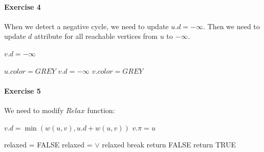\documentclass{book}
\begin{document}
	\paragraph{Exercise 4}
	When we detect a negative cycle, we need to update $u.d = -\infty$. Then we need to update $d$ attribute for all reachable vertices from $u$ to $-\infty$.
	\begin{algorithm*}[h!]
		\begin{algorithmic}[1]
				\State {}
						\State {}
					\EndFor
				\EndFor
				\State {}
						\State $v.d = -\infty$
						\State {}
					\EndIf
				\EndFor
			\EndFunction
		\end{algorithmic}
	\end{algorithm*}
	\begin{algorithm*}[h!]
		\begin{algorithmic}[1]
				\State $u.color = GREY$
						\State $v.d = -\infty$
						\State $v.color = GREY$
						\State {}
					\EndIf
				\EndFor
			\EndFunction
		\end{algorithmic}
	\end{algorithm*}
	\FloatBarrier
	\paragraph{Exercise 5}
	We need to modify $Relax$ function:
	\begin{algorithm*}[h!]
		\begin{algorithmic}[1]
					\State $v.d = \min(w(u, v), u.d + w(u, v))$
					\State $v.\pi = u$
				\EndIf
			\EndFunction
		\end{algorithmic}

		\begin{algorithmic}[1]
				\State {}
					\State relaxed = FALSE
						\State relaxed =  $\lor$ relaxed
					\EndFor
						\State break
					\EndIf
				\EndFor
						\State return FALSE
					\EndIf
				\EndFor
				\State return TRUE
			\EndFunction
		\end{algorithmic}		
	\end{algorithm*}	
	\FloatBarrier
\end{document}
